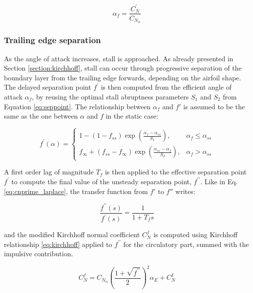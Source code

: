 \begin{equation}
\alpha_f = \frac{C_N^{\prime}}{C_{N_\alpha}}
\label{eq:separated_effective_alpha}
\end{equation}

\subsubsection{Trailing edge separation}

As the angle of attack increases, stall is approached. As already presented in Section \ref{section:kirchhoff}, stall can occur through progressive separation of the boundary layer from the trailing edge forwards, depending on the airfoil shape. The delayed separation point $f^{\prime}$ is then computed from the efficient angle of attack $\alpha_f$, by reusing the optimal stall abruptness parameters $S_1$ and $S_2$ from Equation \eqref{eq:seppoint}.  The relationship between $\alpha_f$ and $f'$ is assumed to be the same as the one between $\alpha$ and $f$ in the static case:

\begin{equation}
f^{\prime}(\alpha)=\left\{\begin{array}{ll}
1-(1-f_{ss}) \exp \left(\frac{\alpha_{f}-\alpha_{ss}}{S_{1}}\right), & \alpha_{f} \leq \alpha_{ss} \\
f_\infty + (f_{ss}-f_\infty) \exp \left(\frac{\alpha_{ss}-\alpha_{f}}{S_{2}}\right), & \alpha_{f}>\alpha_{ss}
\end{array}\right.
\end{equation}

A first order lag of magnitude $T_f$ is then applied to the effective separation point $f^{\prime}$ to compute the final value of the unsteady separation point, $f^{\prime \prime}$. Like in Eq. \eqref{eq:cnprime_laplace}, the transfer function from $f'$ to $f''$ writes:

\begin{equation}
\frac{f^{\prime \prime}(s)}{f^{\prime} (s)} = \frac{1}{1 + T_f s}
\end{equation}

\noindent and the modified Kirchhoff normal coefficient $C_N^f$ is computed using Kirchhoff relationship \eqref{eq:kirchhoff} applied to $f^{\prime \prime}$ for the circulatory part, summed with the impulsive contribution.

\begin{equation}
	C_{N}^{f}=C_{N_{\alpha}}\left(\frac{1+\sqrt{f^{\prime \prime}}}{2}\right)^{2} \alpha_{E}+C_{N}^{I}
	\label{eq:mod_kirchhoff}
\end{equation}

